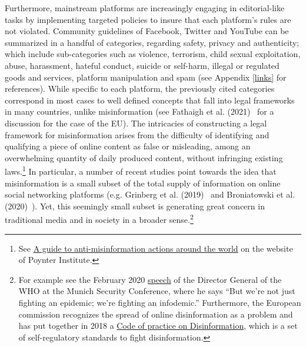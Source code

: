 \documentclass{article}
\begin{document}
Furthermore, mainstream platforms are increasingly engaging in editorial-like tasks by implementing targeted policies to insure that each platform's rules are not violated. Community guidelines of Facebook, Twitter and YouTube can be summarized in a handful of categories, regarding safety, privacy and authenticity; which include sub-categories such as violence, terrorism, child sexual exploitation, abuse, harassment, hateful conduct, suicide or self-harm, illegal or regulated goods and services, platform manipulation and spam (see Appendix \ref{links} for references). While specific to each platform, the previously cited categories correspond in most cases to well defined concepts that fall into legal frameworks in many countries, unlike misinformation (see Fathaigh et al. (2021)~\cite{fathaigh} for a discussion for the case of the EU). The intricacies of constructing a legal framework for misinformation arises from the difficulty of identifying and qualifying a piece of online content as false or misleading, among an overwhelming quantity of daily produced content, without infringing existing laws.\footnote{See \href{https://www.poynter.org/ifcn/anti-misinformation-actions/}{A guide to anti-misinformation actions around the world} on the website of Poynter Institute.} In particular, a number of recent studies point towards the idea that misinformation is a small subset of the total supply of information on online social networking platforms (e.g. Grinberg et al. (2019)~\cite{grinberg} and Broniatowski et al. (2020)~\cite{broniatowski}). Yet, this seemingly small subset is generating great concern in traditional media and in society in a broader sense.\footnote{For example see the February 2020 \href{https://www.who.int/director-general/speeches/detail/munich-security-conference}{speech} of the Director General of the WHO at the Munich Security Conference, where he says ``But we’re not just fighting an epidemic; we’re fighting an infodemic.'' Furthermore, the European commission recognizes the spread of online disinformation as a problem and has put together in 2018 a \href{https://digital-strategy.ec.europa.eu/en/policies/code-practice-disinformation}{Code of practice on Disinformation}, which is a set of self-regulatory standards to fight disinformation.}

\smallskip
\end{document}
